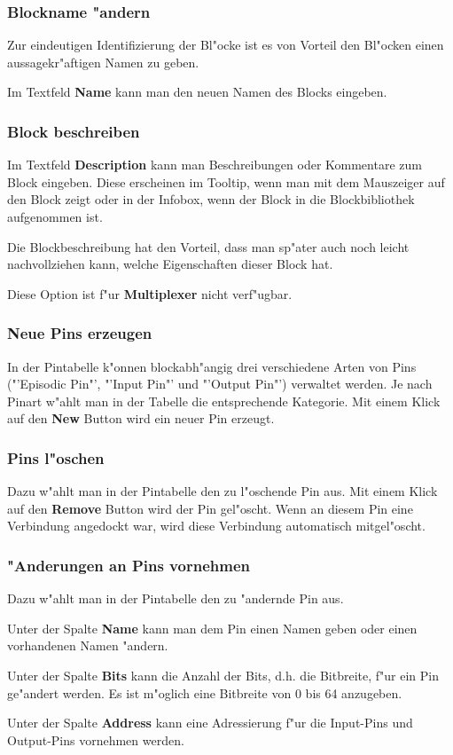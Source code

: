 \documentclass[a4paper,titlepage,12pt,ngerman]{scrbook}
\begin{document}
\subsubsection{Blockname "andern}
Zur eindeutigen Identifizierung der Bl"ocke ist es von Vorteil den Bl"ocken einen aussagekr"aftigen Namen zu geben. \par
Im Textfeld {\bf Name} kann man den neuen Namen des Blocks eingeben.
\subsubsection{Block beschreiben}
Im Textfeld {\bf Description} kann man Beschreibungen oder Kommentare zum Block eingeben. Diese erscheinen im Tooltip, wenn man mit dem Mauszeiger auf den Block zeigt oder in der Infobox, wenn der Block in die Blockbibliothek aufgenommen ist.\par
Die Blockbeschreibung hat den Vorteil, dass man sp"ater auch noch leicht nachvollziehen kann, welche Eigenschaften dieser Block hat.\par
Diese Option ist f"ur {\bf Multiplexer} nicht verf"ugbar.
\subsubsection{Neue Pins erzeugen}
In der Pintabelle k"onnen blockabh"angig drei verschiedene Arten von Pins ("'Episodic Pin"', "'Input Pin"' und "'Output Pin"') verwaltet werden. Je nach Pinart w"ahlt man in der Tabelle die entsprechende Kategorie. Mit einem Klick auf den {\bf New} Button wird ein neuer Pin erzeugt. \par
\subsubsection{Pins l"oschen}
Dazu w"ahlt man in der Pintabelle den zu l"oschende Pin aus. Mit einem Klick auf den {\bf Remove} Button wird der Pin gel"oscht. Wenn an diesem Pin eine Verbindung angedockt war, wird diese Verbindung automatisch mitgel"oscht.
\subsubsection{"Anderungen an Pins vornehmen}
Dazu w"ahlt man in der Pintabelle den zu "andernde Pin aus.\par
Unter der Spalte {\bf Name} kann man dem Pin einen Namen geben oder einen vorhandenen Namen "andern.\par
Unter der Spalte {\bf Bits} kann die Anzahl der Bits, d.h. die Bitbreite, f"ur ein Pin ge"andert werden. Es ist m"oglich eine Bitbreite von 0 bis 64 anzugeben.\par
Unter der Spalte {\bf Address} kann eine Adressierung f"ur die Input-Pins und Output-Pins vornehmen werden.\par
\end{document}
